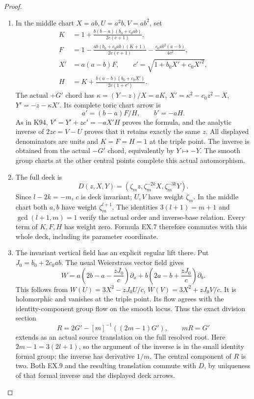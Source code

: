 \begin{proof}
\begin{enumerate}[label=\arabic*.]
\item In the middle chart \(X=ab,U=a^2b,V=ab^2\), set
\[
\begin{aligned}
 K&=1+\frac{b(b-a)(b_0+c_0ab)}{2c(c+1)},\\
 F&=1-\frac{ab(b_0+c_0ab)(K+1)}{2c(c+1)}
           -\frac{c_0ab^2(a-b)}{4c^2},\\
 X'&=a(a-b)F,\qquad c'=\sqrt{1+b_0X'+c_0X'^2},\\
 H&=K+\frac{b(a-b)(b_0+c_0X')}{2c(1+c')}.
\end{aligned}
\]
The actual \(+G'\) chord has \(\kappa=(Y-z)/X=aK\),
\(X'=\kappa^2-c_0z^2-X\), \(Y'=-z-\kappa X'\).
Its complete toric chart arrow is
\[
                  a'=(b-a)F/H,\qquad b'=-aH.
 \tag{EX.7}
\]
As in K94, \(V'=Y'+zc'=-aX'H\) proves the formula, and the
analytic inverse of \(2zc=V-U\) proves that it retains exactly
the same \(z\). All displayed denominators are units and
\(K=F=H=1\) at the triple point. The inverse is obtained from
the actual \(-G'\) chord, equivalently by \(Y\mapsto-Y\).
The smooth group charts at the other central points complete
this actual automorphism.

\item The full deck is
\[
 D(z,X,Y)=(\zeta_mz,\zeta_m^{-2k}X,\zeta_m^{-3k}Y).
\]
Since \(l-2k=-m\), \(c\) is deck invariant; \(U,V\) have
weight \(\zeta_m\). In the middle chart both \(a,b\) have
weight \(\zeta_m^{l+1}\). The identities
\(3(l+1)=m+1\) and \(\gcd(l+1,m)=1\) verify the actual
order and inverse-base relation. Every term of \(K,F,H\) has
weight zero. Formula EX.7 therefore commutes with this whole
deck, including its parameter coordinate.

\item The invariant vertical field has an explicit regular lift there.
Put \(J_0=b_0+2c_0ab\). The usual Weierstrass vector field gives
\[
 W=a\left(2b-a-\frac{zJ_0}{c}\right)\partial_a
   +b\left(2a-b+\frac{zJ_0}{c}\right)\partial_b.
 \tag{EX.8}
\]
This follows from
\(W(U)=3X^2-zJ_0U/c\), \(W(V)=3X^2+zJ_0V/c\).
It is holomorphic and vanishes at the triple point. Its flow
agrees with the identity-component group flow on the smooth
locus. Thus the exact division section
\[
 R=2G'-[m]^{-1}((2m-1)G'),\qquad mR=G'
 \tag{EX.9}
\]
extends as an actual source translation on the full resolved
root. Here \(2m-1=3(2l+1)\), so the argument of the inverse is
in the small identity formal group; the inverse has derivative
\(1/m\). The central component of \(R\) is two. Both EX.9
and the resulting translation commute with \(D\), by uniqueness
of that formal inverse and the displayed deck arrows.


\end{enumerate}
\end{proof}
